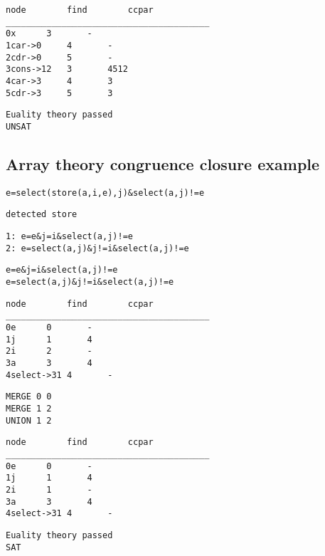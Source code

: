 \documentclass{IEEEtran}
\begin{document}
\begin{lstlisting}
node		find		ccpar
________________________________________
0x		3		-
1car->0		4		-
2cdr->0		5		-
3cons->12	3		4512
4car->3		4		3
5cdr->3		5		3
\end{lstlisting}
\begin {center}
\end{center}
\begin{lstlisting}
Euality theory passed
UNSAT
\end{lstlisting}


\subsection{Array theory congruence closure example}
\begin{lstlisting}
e=select(store(a,i,e),j)&select(a,j)!=e
\end{lstlisting}
\begin{lstlisting}
detected store
\end{lstlisting}
\begin{lstlisting}
1: e=e&j=i&select(a,j)!=e
2: e=select(a,j)&j!=i&select(a,j)!=e
\end{lstlisting}
\begin{lstlisting}
e=e&j=i&select(a,j)!=e
e=select(a,j)&j!=i&select(a,j)!=e
\end{lstlisting}
\begin{lstlisting}
node		find		ccpar
________________________________________
0e		0		-
1j		1		4
2i		2		-
3a		3		4
4select->31	4		-
\end{lstlisting}
\begin{lstlisting}
MERGE 0 0
MERGE 1 2
UNION 1 2
\end{lstlisting}
\begin{lstlisting}
node		find		ccpar
________________________________________
0e		0		-
1j		1		4
2i		1		-
3a		3		4
4select->31	4		-
\end{lstlisting}
\begin{lstlisting}
Euality theory passed
SAT
\end{lstlisting}
\end{document}
